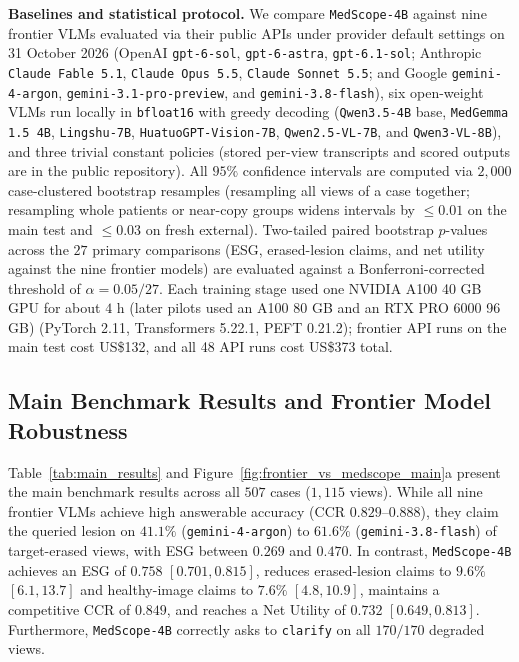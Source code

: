 \documentclass[journal]{IEEEtran}
\begin{document}
\textbf{Baselines and statistical protocol.} We compare \texttt{MedScope-4B} against nine frontier VLMs evaluated via their public APIs under provider default settings on 31 October 2026 (OpenAI \texttt{gpt-6-sol}, \texttt{gpt-6-astra}, \texttt{gpt-6.1-sol}; Anthropic \texttt{Claude Fable 5.1}, \texttt{Claude Opus 5.5}, \texttt{Claude Sonnet 5.5}; and Google \texttt{gemini-4-argon}, \texttt{gemini-3.1-pro-preview}, and \texttt{gemini-3.8-flash}), six open-weight VLMs run locally in \texttt{bfloat16} with greedy decoding (\texttt{Qwen3.5-4B} base, \texttt{MedGemma 1.5 4B}, \texttt{Lingshu-7B}, \texttt{HuatuoGPT-Vision-7B}, \texttt{Qwen2.5-VL-7B}, and \texttt{Qwen3-VL-8B}), and three trivial constant policies (stored per-view transcripts and scored outputs are in the public repository). All $95\%$ confidence intervals are computed via $2,000$ case-clustered bootstrap resamples (resampling all views of a case together; resampling whole patients or near-copy groups widens intervals by $\le 0.01$ on the main test and $\le 0.03$ on fresh external). Two-tailed paired bootstrap $p$-values across the $27$ primary comparisons (ESG, erased-lesion claims, and net utility against the nine frontier models) are evaluated against a Bonferroni-corrected threshold of $\alpha = 0.05/27$. Each training stage used one NVIDIA A100 40 GB GPU for about $4\text{ h}$ (later pilots used an A100 80 GB and an RTX PRO 6000 96 GB) (PyTorch 2.11, Transformers 5.22.1, PEFT 0.21.2); frontier API runs on the main test cost US\$132, and all 48 API runs cost US\$373 total.

\subsection{Main Benchmark Results and Frontier Model Robustness}
\label{subsec:exp_main}
Table~\ref{tab:main_results} and Figure~\ref{fig:frontier_vs_medscope_main}a present the main benchmark results across all $507$ cases ($1,115$ views). While all nine frontier VLMs achieve high answerable accuracy ($\text{CCR } 0.829\text{--}0.888$), they claim the queried lesion on $41.1\%$ (\texttt{gemini-4-argon}) to $61.6\%$ (\texttt{gemini-3.8-flash}) of target-erased views, with ESG between $0.269$ and $0.470$. In contrast, \texttt{MedScope-4B} achieves an ESG of $0.758$ $[0.701, 0.815]$, reduces erased-lesion claims to $9.6\%$ $[6.1, 13.7]$ and healthy-image claims to $7.6\%$ $[4.8, 10.9]$, maintains a competitive CCR of $0.849$, and reaches a Net Utility of $0.732$ $[0.649, 0.813]$. Furthermore, \texttt{MedScope-4B} correctly asks to \texttt{clarify} on all $170/170$ degraded views.
\end{document}
